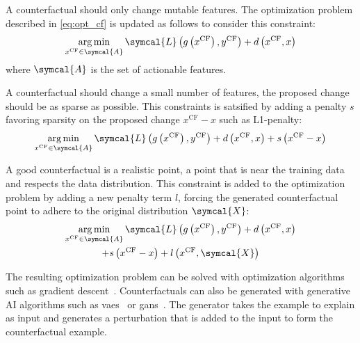\documentclass[../main.tex]{subfiles}
\begin{document}
	\begin{description}[
			style=multiline,
			leftmargin=!,
			labelwidth=3cm,
		]
		\item[Actionnability\label{item:cf_actionability}]
			A counterfactual should only change mutable features.
			The optimization problem described in \cref{eq:opt_cf} is updated as follows to consider this constraint:
			\[\argmin_{x^{\text{CF}} \in \symcal{A}} \symcal{L}\left(g\left(x^{\text{CF}}\right), y^{\text{CF}} \right) + d\left(x^{\text{CF}}, x\right)\]
			where \(\symcal{A}\) is the set of actionable features.
		\item[Sparsity\label{item:cf_sparse}]
			A counterfactual should change a small number of features, \ie{}the proposed change should be as sparse as possible.
			This constraints is satsified by adding a penalty \(s\) favoring sparsity on the proposed change \(x^{\text{CF}} - x\) such as L1-penalty:
			\begin{equation*}
				\argmin_{x^{\text{CF}} \in \symcal{A}} \symcal{L}\left(g\left(x^{\text{CF}}\right), y^{\text{CF}} \right) + d\left(x^{\text{CF}}, x\right) + s\left(x^{\text{CF}}-x\right)
			\end{equation*}
		\item[Data manifold closeness\label{item:cf_data_manifold}]
			A good counterfactual is a realistic point, a point that is near the training data and respects the data distribution.
			This constraint is added to the optimization problem by adding a new penalty term \(l\), forcing the generated counterfactual point to adhere to the original distribution \(\symcal{X}\):
			\begin{multline*}
				\argmin_{x^{\text{CF}} \in \symcal{A}} \symcal{L}\left(g\left(x^{\text{CF}}\right), y^{\text{CF}} \right) + d\left(x^{\text{CF}}, x\right)\\ + s\left(x^{\text{CF}}-x\right) + l\left(x^{\text{CF}}, \symcal{X}\right)
			\end{multline*}
	\end{description}
	The resulting optimization problem can be solved with optimization algorithms such as gradient descent~\cite{wachter2017counterfactual}.
	Counterfactuals can also be generated with generative AI algorithms such as \glspl{vae}~\cite{mahajan2020preservingcausalconstraintscounterfactual} or \glspl{gan}~\cite{CounteRGAN,vanlooveren2021conditionalgenerativemodelscounterfactual,Yang2021ModelBasedCS}.
	The generator takes the example to explain as input and generates a perturbation that is added to the input to form the counterfactual example.
\end{document}
